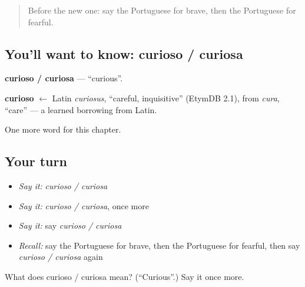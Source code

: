 \label{lesson:PT-C185-curioso-curiosa}



\begin{quote}
Before the new one: say the Portuguese for brave, then the Portuguese for fearful.
\end{quote}

\subsection*{You'll want to know: curioso / curiosa}
\textbf{curioso / curiosa} — \textquotedblleft{}curious\textquotedblright{}.

\begin{cousinweb}
\textbf{curioso} $\leftarrow$ Latin \emph{curiosus}, \textquotedblleft{}careful, inquisitive\textquotedblright{} (EtymDB 2.1), from \emph{cura}, \textquotedblleft{}care\textquotedblright{} — a learned borrowing from Latin.
\end{cousinweb}

\begin{grammarlens}[title={What you've built}]
One more word for this chapter.
\end{grammarlens}

\subsection*{Your turn}
\begin{itemize}
\raggedright
  \item \emph{Say it:} \emph{curioso / curiosa}
  \item \emph{Say it:} \emph{curioso / curiosa}, once more
  \item \emph{Say it:} say \emph{curioso / curiosa}
  \item \emph{Recall:} say the Portuguese for brave, then the Portuguese for fearful, then say \emph{curioso / curiosa} again
\end{itemize}

\begin{tcolorbox}[breakable,colback=teal!4,colframe=teal!35!black,title={Before you move on}]
What does curioso / curiosa mean? (\textquotedblleft{}Curious\textquotedblright{}.) Say it once more.
\end{tcolorbox}
